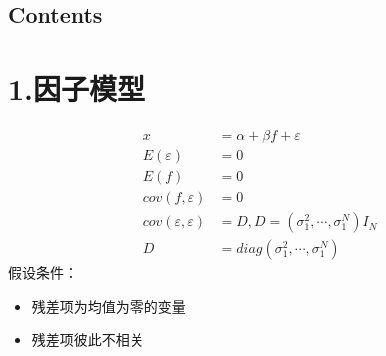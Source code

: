 \documentclass{article}
\begin{document}
{
\mdxtitleblockstart{}
\mdxauthorstart{}


\mdxauthorend\mdtitleauthorrunning{}{}\mdxtitleblockend%
\begin{mdtoc}%

\section*{Contents}\label{sec-contents}%

\begin{mdtocblock}%

\end{mdtocblock}%
\end{mdtoc}%

\section{1.\hspace*{0.5em}因子模型}\label{section}%
\label{}%
\noindent{}
\noindent\[%
\begin{aligned}
x &= \alpha+\beta f+\varepsilon  \\ 
E(\varepsilon) &= 0\\ 
E(f)&= 0\\ 
 cov(f,\varepsilon)&=0 \\ 
 cov(\varepsilon,\varepsilon)&= D,D=(\sigma_1^2,\cdots ,\sigma_1^N)I_N\\ 
 D&= diag(\sigma_1^2,\cdots ,\sigma_1^N)
\end{aligned}
\]%
\noindent{}假设条件：

\begin{itemize}[noitemsep,topsep=\mdcompacttopsep]%

\item{}残差项为均值为零的变量%

\item{}残差项彼此不相关%


\end{itemize}}
\end{document}

